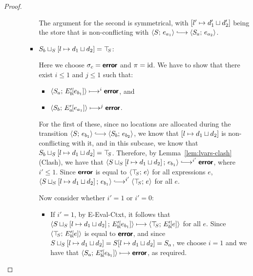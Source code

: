 \begin{proof}
\begin{enumerate}
\begin{enumerate}
\begin{itemize}
        The argument for the second is symmetrical, with
        $\left[ l' \mapsto d'_1 \sqcup d'_2 \right]$ being the
        store that is non-conflicting with $\config{S}{e_{a_1}}
        \parstepsto \config{S_a}{e_{a_2}}$.

      \item
        $S_b \sqcup_{S} \left[ l \mapsto d_1 \sqcup d_2 \right]
        = \top\hspace{-0.85mm}_{S}$:

        Here we choose $\sigma_c = \textbf{\textsf{error}}$ and $\pi = \mathrm{id}$.  We have to
        show that there exist $i \leq 1$ and $j \leq 1$ such that:
        \begin{itemize}
        \item $\langle S_a;\, E'_b\hspace{-1mm}\left[e_{b_1}\right] \rangle \longmapsto^i
          \textbf{\textsf{error}}$, and
        \item
          $\langle S_b;\, E'_a\hspace{-1mm}\left[e_{a_1}\right] \rangle \longmapsto^j \textbf{\textsf{error}}$.
        \end{itemize}

        For the first of these, since no locations are allocated
        during the transition $\config{S}{e_{b_1}} \parstepsto
        \config{S_b}{e_{b_2}}$, we know that
        $\left[ l \mapsto d_1 \sqcup d_2 \right]$ is
        non-conflicting with it, and in this subcase, we know that
        $S_b \sqcup_{S} \left[ l \mapsto d_1 \sqcup d_2 \right]
        = \top\hspace{-0.85mm}_{S}$.  Therefore, by Lemma~\ref{lem:lvars-clash} (Clash),
        we have that
        $\config{\lubstore{S}{\store{\storebindingRaw{l}{\userlub{d_1}{d_2}}}}}{e_{b_1}}
        \parstepsto^{i'} \error$, where $i' \leq 1$.  Since $\textbf{\textsf{error}}$ is
        equal to $\langle \top\hspace{-0.85mm}_{S};\, e \rangle$ for all expressions $e$,
        $\config{\lubstore{S}{\store{\storebindingRaw{l}{\userlub{d_1}{d_2}}}}}{e_{b_1}}
        \parstepsto^{i'} \config{\topS}{e}$ for all $e$.

        Now consider whether $i' = 1$ or $i' = 0$:
        \begin{itemize}
          \item If $i' = 1$, by {\sc E-Eval-Ctxt}, it follows that
            $\langle S \sqcup_{S} \left[ l \mapsto d_1 \sqcup d_2 \right];\, E'_b\hspace{-1mm}\left[e_{b_1}\right] \rangle
            \longmapsto \langle \top\hspace{-0.85mm}_{S};\, E'_b\hspace{-1mm}\left[e\right] \rangle$ for all
            $e$.  Since $\langle \top\hspace{-0.85mm}_{S};\, E'_b\hspace{-1mm}\left[e\right] \rangle$ is equal
            to $\textbf{\textsf{error}}$, and since
            $S \sqcup_{S} \left[ l \mapsto d_1 \sqcup d_2 \right]
            = S[l \mapsto d_1 \sqcup d_2] = S_a$, we choose $i
            = 1$ and we have that
            $\langle S_a;\, E'_b\hspace{-1mm}\left[e_{b_1}\right] \rangle \longmapsto
            \textbf{\textsf{error}}$, as required.


\end{itemize}
\end{itemize}
\end{enumerate}
\end{enumerate}
\end{proof}
